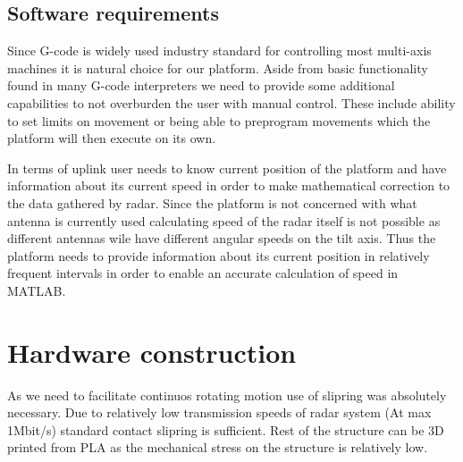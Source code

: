 
\section{Software requirements}

Since G-code is widely used industry standard for controlling most multi-axis machines it is natural choice for our platform.
Aside from basic functionality found in many G-code interpreters we need to provide some additional capabilities to not overburden the user with manual control.
These include ability to set limits on movement or being able to preprogram movements which the platform will then execute on its own.


In terms of uplink user needs to know current position of the platform and have information about its current speed in order to make mathematical correction to the data gathered by radar.
Since the platform is not concerned with what antenna is currently used calculating speed of the radar itself is not possible as different antennas wile have different angular speeds on the tilt axis.
Thus the platform needs to provide information about its current position in relatively frequent intervals in order to enable an accurate calculation of speed in MATLAB.




\chapter{Hardware construction}

As we need to facilitate continuos rotating motion use of slipring was absolutely necessary.
Due to relatively low transmission speeds of radar system (At max 1Mbit/s) standard contact slipring is sufficient.
Rest of the structure can be 3D printed from PLA as the mechanical stress on the structure is relatively low.

